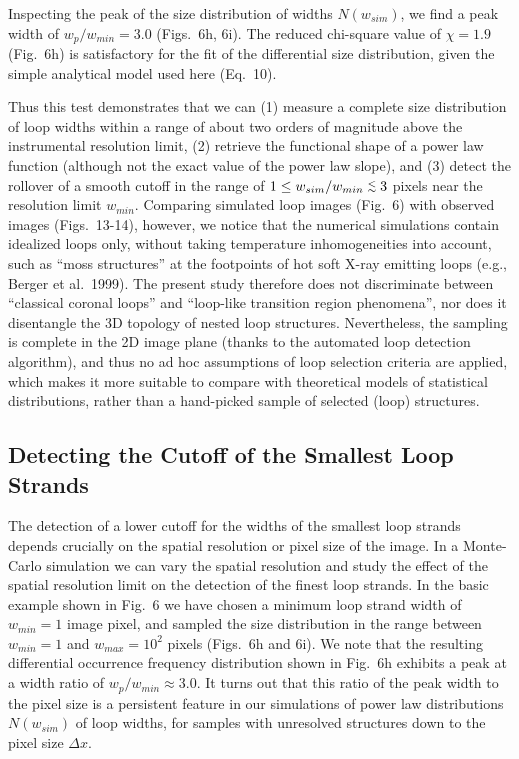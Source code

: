 \documentclass[10pt,preprint]{aastex}  %
\def\lapprox{\lower.4ex\hbox{$\;\buildrel <\over{\scriptstyle\sim}\;$}}
\begin{document}
Inspecting the peak of the size distribution of widths $N(w_{sim})$, 
we find a peak width of $w_p/w_{min}=3.0$ (Figs.~6h, 6i).
The reduced chi-square value of $\chi = 1.9$ (Fig.~6h) is
satisfactory for the fit of the differential size distribution,
given the simple analytical model used here (Eq.~10). 

Thus this test demonstrates that we can (1) measure
a complete size distribution of loop widths within a range
of about two orders of magnitude above the instrumental
resolution limit, (2) retrieve the functional shape of a power law 
function (although not the exact value of the power law slope), 
and (3) detect the rollover of a smooth cutoff in the range of 
$1 \le w_{sim}/w_{min} \lapprox 3$ pixels near the resolution limit 
$w_{min}$. Comparing simulated loop images (Fig.~6) with
observed images (Figs.~13-14), however, we notice that
the numerical simulations contain idealized loops only, without
taking temperature inhomogeneities into account, such as ``moss
structures'' at the footpoints of hot soft X-ray emitting loops
(e.g., Berger et al.~1999). The present study therefore does not
discriminate between ``classical coronal loops'' and ``loop-like
transition region phenomena'', nor does it disentangle the
3D topology of nested loop structures. Nevertheless, the sampling
is complete in the 2D image plane (thanks to the automated
loop detection algorithm), and thus no ad hoc assumptions 
of loop selection criteria are applied, which makes it more 
suitable to compare with theoretical models of statistical 
distributions, rather than a hand-picked sample of selected 
(loop) structures.

\subsection{	Detecting the Cutoff of the Smallest Loop Strands	}

The detection of a lower cutoff for the widths of the smallest 
loop strands depends crucially on the spatial resolution or
pixel size of the image.
In a Monte-Carlo simulation we can vary the spatial resolution
and study the effect of the spatial resolution limit on the
detection of the finest loop strands. In the basic example
shown in Fig.~6 we have chosen a minimum loop strand width 
of $w_{min}=1$ image pixel, and sampled the size distribution
in the range between $w_{min}=1$ and $w_{max}=10^2$ pixels 
(Figs.~6h and 6i). We note that the resulting differential
occurrence frequency distribution shown in Fig.~6h exhibits
a peak at a width ratio of $w_p/w_{min} \approx 3.0$. It turns out
that this ratio of the peak width to the pixel size
is a persistent feature in our simulations of power law
distributions $N(w_{sim})$ of loop widths, for samples with unresolved
structures down to the pixel size $\Delta x$. 
\end{document}
